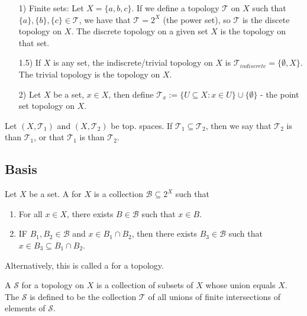\documentclass[12pt, a4paper, oneside, openright, titlepage]{book}
\begin{document}
\begin{example}
    \leavevmode
    \begin{enumerate}
        \item[1)] Finite sets: Let $X = \{a,b,c\}$. If we define a topology $\mathcal{T}$ on $X$ such that $\{a\},\{b\},\{c\} \in \mathcal{T}$, we have that $\mathcal{T} = 2^X$ (the power set), so $\mathcal{T}$ is the discete topology on $X$. The discrete topology on a given set $X$ is the  topology on that set.
        \item[1.5)] If $X$ is any set, the indiscrete/trivial topology on $X$ is $\mathcal{T}_{indiscrete} = \{\emptyset,X\}$. The trivial topology is the  topology on $X$.
        \item[2)] Let $X$ be a set, $x \in X$, then define $\mathcal{T}_x := \{U \subseteq X: x \in U\}\cup\{\emptyset\}$ - the point set topology on $X$.
    \end{enumerate}
\end{example}

\begin{definition}
    Let $(X,\mathcal{T}_1)$ and $(X,\mathcal{T}_2)$ be top. spaces. If $\mathcal{T}_1\subseteq \mathcal{T}_2$, then we say that $\mathcal{T}_2$ is  than $\mathcal{T}_1$, or that $\mathcal{T}_1$ is  than $\mathcal{T}_2$.
\end{definition}




\subsection{Basis}

\begin{definition}
    Let $X$ be a set. A  for $X$ is a collection $\mathcal{B}\subseteq 2^X$ such that \begin{enumerate}
        \item For all $x \in X$, there exists $B \in \mathcal{B}$ such that $x \in B$.
        \item IF $B_1,B_2 \in \mathcal{B}$ and $x \in B_1\cap B_2$, then there exists $B_3 \in \mathcal{B}$ such that $x \in B_3 \subseteq B_1\cap B_2$.
    \end{enumerate}
    Alternatively, this is called a  for a topology.
\end{definition}

\begin{definition}
    A  $\mathcal{S}$ for a topology on $X$ is a collection of subsets of $X$ whose union equals $X$. The  $\mathcal{S}$ is defined to be the collection $\mathcal{T}$ of all unions of finite intersections of elements of $\mathcal{S}$.
\end{definition}
\end{document}
